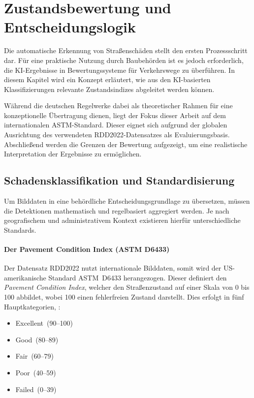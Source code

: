 \section{Zustandsbewertung und Entscheidungslogik}
\label{sec:zustandsbewertung}

Die automatische Erkennung von Straßenschäden stellt den ersten Prozessschritt dar. Für eine praktische Nutzung durch Baubehörden ist es jedoch erforderlich, die KI-Ergebnisse in Bewertungssysteme für Verkehrswege zu überführen. In diesem Kapitel wird ein Konzept erläutert, wie aus den KI-basierten Klassifizierungen relevante Zustandsindizes abgeleitet werden können. 

Während die deutschen Regelwerke dabei als theoretischer Rahmen für eine konzeptionelle Übertragung dienen, liegt der Fokus dieser Arbeit auf dem internationalen ASTM-Standard. Dieser eignet sich aufgrund der globalen Ausrichtung des verwendeten RDD2022-Datensatzes als Evaluierungsbasis. Abschließend werden die Grenzen der Bewertung aufgezeigt, um eine realistische Interpretation der Ergebnisse zu ermöglichen.

\subsection{Schadensklassifikation und Standardisierung}
\label{subsec:normen}

Um Bilddaten in eine behördliche Entscheidungsgrundlage zu übersetzen, müssen die Detektionen mathematisch und regelbasiert aggregiert werden. Je nach geografischem und administrativem Kontext existieren hierfür unterschiedliche Standards.

\paragraph{Der Pavement Condition Index (ASTM D6433)}
Der Datensatz RDD2022 nutzt internationale Bilddaten, somit wird der US-amerikanische Standard ASTM~D6433 herangezogen. Dieser definiert den \emph{Pavement Condition Index}, welcher den Straßenzustand auf einer Skala von 0 bis 100 abbildet, wobei 100 einen fehlerfreien Zustand darstellt. Dies erfolgt in fünf Hauptkategorien, \cite{astm_d6433_18}: 
\begin{itemize}
    \item \glqq Excellent\grqq\ (90--100)
    \item \glqq Good\grqq\ (80--89)
    \item \glqq Fair\grqq\ (60--79)
    \item \glqq Poor\grqq\ (40--59)
    \item \glqq Failed\grqq\ (0--39)
\end{itemize}

